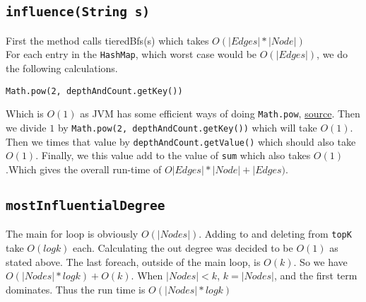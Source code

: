 \documentclass[10pt,letterpaper]{article}
\begin{document}
\subsection{\texttt{influence(String s)}}
First the method calls tieredBfs(s) which takes $O(|Edges| * |Node|)$\\
For each entry in the \texttt{HashMap}, which worst case would be $O(|Edges|)$, we do the following calculations.

\begin{verbatim}
Math.pow(2, depthAndCount.getKey()) 
\end{verbatim}
Which is $O(1)$ as JVM has some efficient ways of doing \texttt{Math.pow}, \href{https://stackoverflow.com/a/32419139/749721}{source}.
Then we divide $1$ by \texttt{Math.pow(2, depthAndCount.getKey())} which will
take $O(1)$. Then we times that value by \texttt{depthAndCount.getValue()} which should also take $O(1)$. Finally, we this value add to the value of \texttt{sum} which also takes $O(1)$.Which gives the overall run-time of $O|Edges| * |Node| + |Edges)$.
\subsection{\texttt{mostInfluentialDegree}}
The main for loop is obviously $O(|Nodes|)$. Adding to and deleting from \texttt{topK} take $O(log k)$ each. Calculating the out degree was decided to be $O(1)$ as stated above. The last foreach, outside of the main loop, is $O(k)$. So we have $O(|Nodes|*log k)+O(k)$. When $|Nodes|<k$, $k=|Nodes|$, and the first term dominates. Thus the run time is $O(|Nodes|*log k)$
\end{document}
